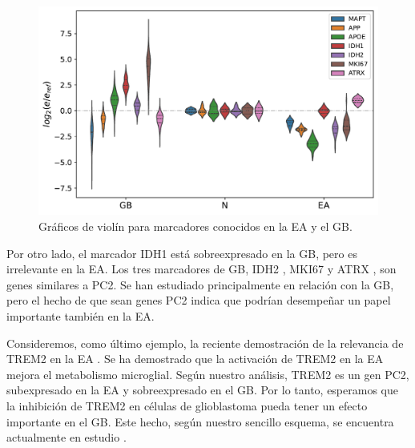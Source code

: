 \begin{figure}[!htb]
	\centering
	\includegraphics[width=\linewidth]{figures/suppl2}
	\caption{Gráficos de violín para marcadores conocidos en la EA y el GB.}
	\label{fig:violin}
\end{figure}

Por otro lado, el marcador IDH1 \cite{Cohen_2013} está sobreexpresado en la GB, pero es irrelevante en la EA. Los tres marcadores de GB, IDH2 \cite{Cohen_2013}, MKI67 \cite{Chen_2015} y ATRX \cite{Haase_2018}, son genes similares a PC2. Se han estudiado principalmente en relación con la GB, pero el hecho de que sean genes PC2 indica que podrían desempeñar un papel importante también en la EA.

Consideremos, como último ejemplo, la reciente demostración de la relevancia de TREM2 en la EA \cite{van_Lengerich_2023}. Se ha demostrado que la activación de TREM2 en la EA mejora el metabolismo microglial. Según nuestro análisis, TREM2 es un gen PC2, subexpresado en la EA y sobreexpresado en el GB. Por lo tanto, esperamos que la inhibición de TREM2 en células de glioblastoma pueda tener un efecto importante en el GB. Este hecho, según nuestro sencillo esquema, se encuentra actualmente en estudio \cite{Sun_2023}.

